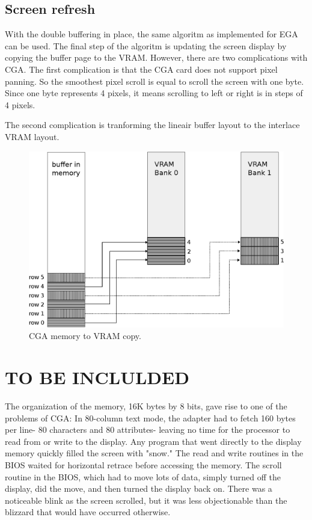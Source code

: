 \documentclass[book.tex]{subfiles}
\begin{document}
\subsection{Screen refresh}
With the double buffering in place, the same algoritm as implemented for EGA can be used. The final step of the algoritm is updating the screen display by copying the buffer page to the VRAM. However, there are two complications with CGA. The first complication is that the CGA card does not support pixel panning. So the smoothest pixel scroll is equal to scroll the screen with one byte. Since one byte represents 4 pixels, it means scrolling to left or right is in steps of 4 pixels.\\
\par
The second complication is tranforming the lineair buffer layout to the interlace VRAM layout. 


\begin{figure}[H]
\centering
\includegraphics[width=1.0\textwidth]{imgs/drawings/cga_VRAM_copy.eps}
\caption{CGA memory to VRAM copy.}
\label{fig:cga_interlaced}
\end{figure}

\section{TO BE INCLULDED}
The organization of the memory, 16K bytes by 8 bits, gave rise to one of the problems of CGA: In 80-column text mode, the adapter had to fetch 160 bytes per line- 80 characters and 80 attributes- leaving no time for the processor to read from or write to the display. Any program that went directly to the display memory quickly filled the screen with "snow." The read and write routines in the BIOS waited for horizontal retrace before accessing the memory. The scroll routine in the BIOS, which had to move lots of data, simply turned off the display, did the move, and then turned the display back on. There was a noticeable blink as the screen scrolled, but it was less objectionable than the blizzard that would have occurred otherwise.
\end{document}
